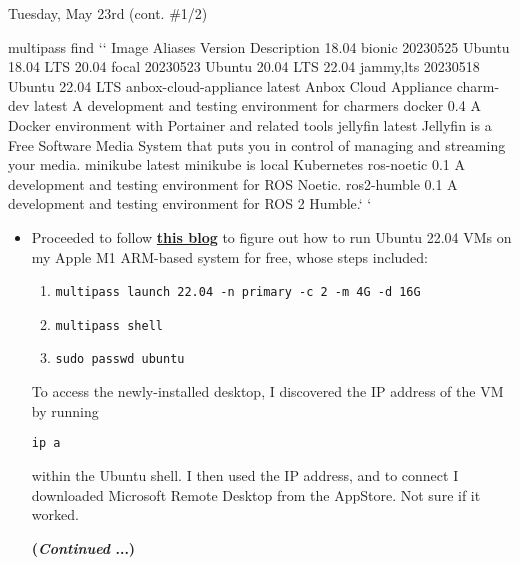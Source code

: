 \documentclass[11pt]{article}
\newcommand\codebox[1]{
    \noindent\hspace{-0.25em}\begin{tcolorbox}[on line, hbox, colback = codeblack, colframe = codeborder, coltext = white, boxrule = 1.5pt, left = 2pt, right = 2pt, top = 0.5pt, bottom = 0.5pt]
    \small\texttt{#1}\normalsize
    \end{tcolorbox}
}
\newcommand{\SU}[1]{\pgfkeys{/MacTerminal/.cd,#1}
    \gdef\MyMacTerminalPrompt{\textcolor{\MyMacTerminalColor}{\small\ttfamily\bfseries \MyMacTerminalUser\MyMacTerminalHost{}\hspace{0.2cm}\textcolor{white}{\url{~}}\hspace{0.2cm}{\textcolor{white}\MyMacTerminalPromptChar}}}}
\newcommand{\StartConsole}{\gdef\MyMacTerminalPrompt{}}
\begin{document}
\begin{redbox}{Tuesday, May 23rd (cont. \#1/2)}
\begin{MacTerminal}
 multipass find `\StartConsole` 
Image                   Aliases      Version     Description
18.04                   bionic       20230525    Ubuntu 18.04 LTS
20.04                   focal        20230523    Ubuntu 20.04 LTS
22.04                   jammy,lts    20230518    Ubuntu 22.04 LTS
anbox-cloud-appliance                latest      Anbox Cloud Appliance
charm-dev                            latest      A development and 
                                                 testing environment 
                                                 for charmers
docker                               0.4         A Docker environment 
                                                 with Portainer and 
                                                 related tools
jellyfin                             latest      Jellyfin is a Free 
                                                 Software Media System 
                                                 that puts you in 
                                                 control of managing 
                                                 and streaming your 
                                                 media.
minikube                             latest      minikube is local 
                                                 Kubernetes
ros-noetic                           0.1         A development and 
                                                 testing environment 
                                                 for ROS Noetic.
ros2-humble                          0.1         A development and 
                                                 testing environment 
                                                 for ROS 2 Humble.`\SU{root}`
    
    \end{MacTerminal}
\begin{itemize}
    \item Proceeded to follow \href{https://medium.com/@paulrobu/how-to-run-ubuntu-22-04-vms-on-apple-m1-arm-based-systems-for-free-c8283fb38309}{\textbf{this blog}} to figure out how to run Ubuntu 22.04 VMs on my Apple M1 ARM-based system for free, whose steps included:
    \begin{enumerate}
        \item\codebox{multipass launch 22.04 -n primary -c 2 -m 4G -d 16G}
        \item\codebox{multipass shell}
        \item\codebox{sudo passwd ubuntu}
    \end{enumerate}
    To access the newly-installed desktop, I discovered the IP address of the VM by running \codebox{ip a}within the Ubuntu shell. I then used the IP address, and to connect I downloaded Microsoft Remote Desktop from the AppStore. Not sure if it worked.
    \begin{center}
        \large\textbf{(\textit{Continued} ...)}
    \end{center}
\end{itemize}
\end{redbox}
\end{document}
